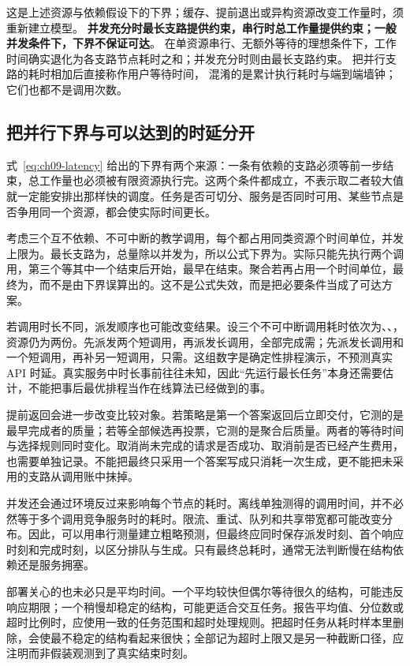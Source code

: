 这是上述资源与依赖假设下的下界；缓存、提前退出或异构资源改变工作量时，须重新建立模型。
\textbf{并发充分时最长支路提供约束，串行时总工作量提供约束；一般并发条件下，下界不保证可达}。
在单资源串行、无额外等待的理想条件下，工作时间确实退化为各支路节点耗时之和；并发充分时则由最长支路约束。
把并行支路的耗时相加后直接称作用户等待时间，
混淆的是累计执行耗时与端到端墙钟；它们也都不是调用次数。

\subsection{把并行下界与可以达到的时延分开}
\label{sec:ch09-scheduling}

式~\eqref{eq:ch09-latency} 给出的下界有两个来源：一条有依赖的支路必须等前一步结束，总工作量也必须被有限资源执行完。这两个条件都成立，不表示取二者较大值就一定能安排出那样快的调度。任务是否可切分、服务是否同时可用、某些节点是否争用同一个资源，都会使实际时间更长。

考虑三个互不依赖、不可中断的教学调用，每个都占用同类资源个时间单位，并发上限为。最长支路为，总量除以并发为，所以公式下界为。实际只能先执行两个调用，第三个等其中一个结束后开始，最早在结束。聚合若再占用一个时间单位，最终为，而不是由下界误算出的。这不是公式失效，而是把必要条件当成了可达方案。

若调用时长不同，派发顺序也可能改变结果。设三个不可中断调用耗时依次为、、，资源仍为两份。先派发两个短调用，再派发长调用，全部完成需；先派发长调用和一个短调用，再补另一短调用，只需。这组数字是确定性排程演示，不预测真实 API 时延。真实服务中时长事前往往未知，因此“先运行最长任务”本身还需要估计，不能把事后最优排程当作在线算法已经做到的事。

提前返回会进一步改变比较对象。若策略是第一个答案返回后立即交付，它测的是最早完成者的质量；若等全部候选再投票，它测的是聚合后质量。两者的等待时间与选择规则同时变化。取消尚未完成的请求是否成功、取消前是否已经产生费用，也需要单独记录。不能把最终只采用一个答案写成只消耗一次生成，更不能把未采用的支路从调用账中抹掉。

并发还会通过环境反过来影响每个节点的耗时。离线单独测得的调用时间，并不必然等于多个调用竞争服务时的耗时。限流、重试、队列和共享带宽都可能改变分布。因此，可以用串行测量建立粗略预测，但最终应同时保存派发时刻、首个响应时刻和完成时刻，以区分排队与生成。只有最终总耗时，通常无法判断慢在结构依赖还是服务拥塞。

部署关心的也未必只是平均时间。一个平均较快但偶尔等待很久的结构，可能违反响应期限；一个稍慢却稳定的结构，可能更适合交互任务。报告平均值、分位数或超时比例时，应使用一致的任务范围和超时处理规则。把超时任务从耗时样本里删除，会使最不稳定的结构看起来很快；全部记为超时上限又是另一种截断口径，应注明而非假装观测到了真实结束时刻。

